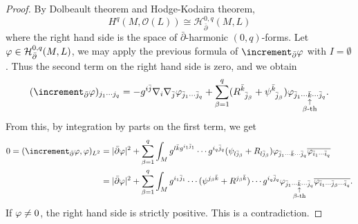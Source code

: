 \documentclass[12pt]{article}
\begin{document}
\begin{proof}
  By Dolbeault theorem and Hodge-Kodaira theorem, \[
    H^q(M,\mathcal{O}(L))\cong \mathcal{H}^{0,q}_{\bar{\partial}}(M,L)
  \] where the right hand side is the space of \(\bar{\partial}\)-harmonic
  \((0,q)\)-forms. Let \(\varphi\in \mathcal{H}_{\bar{\partial}}^{0,q}(M,L)\),
  we may apply the previous formula of \(\lap_{\bar{\partial}}\vphi\) with
  \(I=\emptyset\). Thus  the second term on the right hand side is zero, and
  we obtain \[
    (\lap_{\bar{\partial}}\vphi)_{j_1\cdots j_q}
    =-g^{i\bar{j}}\nabla_i \nabla_{\bar{j}}\vphi_{\bar{j}_1\cdots \bar{j}_q}
    +\sum_{\beta=1}^q (R\indices{^{\bar{k}}_{\bar{j}_\beta}}
    +\psi\indices{^{\bar{k}}_{\bar{j}_\beta}})
    \vphi_{\bar{j}_1\cdots\underset{\mathclap{\substack{\uparrow\\\beta\text{-th}
    }}}{\bar{k}}\cdots \bar{j}_q}
  .\] From this, by integration by parts on the first term, we get
  \begin{align*}
    0=(\lap_{\bar{\partial}}\vphi,\vphi)_{L^2}&=|\bar{\partial}\vphi|^2
    +\sum_{\beta=1}^{q}\int_{M}g^{l\bar{k}g^{i_1\bar{j}_1}}\cdots
    g^{i_q\bar{j}_q}(\psi_{l\bar{j}_\beta}+R_{l\bar{j}_\beta})
    \vphi_{\bar{j}_1\cdots \bar{k}\cdots \bar{j}_q}\overline{\vphi_{\bar{i}_1
    \cdots\bar{i}_q}} \\
    &=|\bar{\partial}\vphi|^2+\sum_{\beta=1}^{q}\int_{M}g^{i_1\bar{j}_1}\cdots
    (\psi^{j_\beta\bar{k}}+R^{j_\beta\bar{k}})\cdots g^{i_q \bar{j}_q}
    \vphi_{\bar{j}_1\cdots\underset{\mathclap{\substack{\uparrow\\\beta\text{-th}
    }}}{\bar{k}}\cdots \bar{j}_q}\overline{\vphi_{\bar{i}_1\cdots\bar{j}_\beta
    \cdots\bar{i}_{q}}}
  .\end{align*} 
  If \(\varphi\neq 0\), the right hand side is strictly positive. This is a
  contradiction.
\end{proof}
\end{document}
